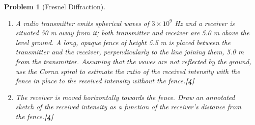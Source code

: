 \documentclass[a4paper]{article}
\theoremstyle{new}
\newtheorem{qns}{Problem}[subsection]
\begin{document}
\begin{qns}[Fresnel Diffraction]
\begin{enumerate}[label=(\roman*)]
\begin{figure}[H]
\end{figure}
\item A radio transmitter emits spherical waves of $3\times10^9$ Hz and a receiver is situated 50 m away from it; both transmitter and receiver are 5.0 m above the level ground. A long, opaque fence of height 5.5 m is placed between the transmitter and the receiver, perpendicularly to the line joining them, 5.0 m from the transmitter. Assuming that the waves are not reflected by the ground, use the Cornu spiral to estimate the ratio of the received intensity with the fence in place to the received intensity without the fence.\hfill\textbf{[4]}
\item The receiver is moved horizontally towards the fence. Draw an annotated sketch of the received intensity as a function of the receiver’s distance from the fence.\hfill\textbf{[4]}
\end{enumerate}
\end{qns}
\newpage
\end{document}
